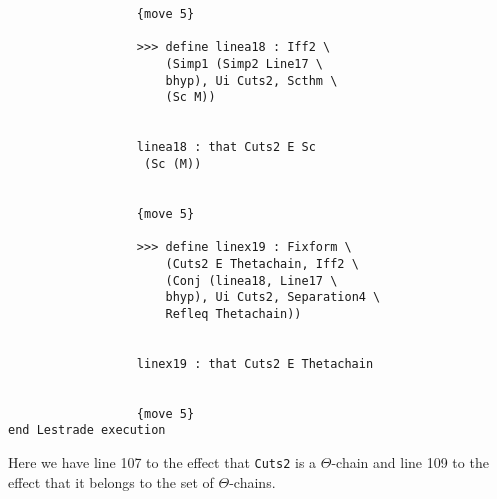 \documentclass[12pt]{article}
\begin{document}
\begin{verbatim}
                  {move 5}

                  >>> define linea18 : Iff2 \
                      (Simp1 (Simp2 Line17 \
                      bhyp), Ui Cuts2, Scthm \
                      (Sc M))


                  linea18 : that Cuts2 E Sc 
                   (Sc (M))


                  {move 5}

                  >>> define linex19 : Fixform \
                      (Cuts2 E Thetachain, Iff2 \
                      (Conj (linea18, Line17 \
                      bhyp), Ui Cuts2, Separation4 \
                      Refleq Thetachain))


                  linex19 : that Cuts2 E Thetachain


                  {move 5}
end Lestrade execution
\end{verbatim}

Here we have line 107 to the effect that {\tt Cuts2} is a $\Theta$-chain and line 109 to the effect that it belongs to the set of $\Theta$-chains.
\end{document}
